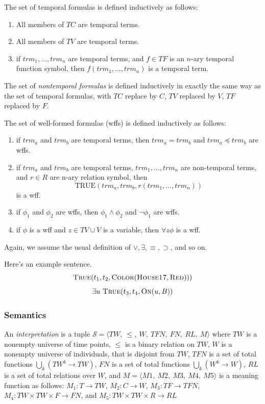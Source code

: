 The set of temporal formulas is defined inductively as follows:
\begin{enumerate}
	\item All members of $TC$ are temporal terms.
	\item All members of $TV$ are temporal terms.
	\item if $trm_1, \dots, trm_n$ are temporal terms, and $f \in TF$ is an $n$-ary temporal function symbol, then $f(trm_1, \dots, trm_n)$ is a temporal term.
\end{enumerate}

The set of \textit{nontemporal formulas} is defined inductively in exactly the same way as the set of temporal formulas, with
$TC$ replace by $C$, $TV$ replaced by $V$, $TF$ replaced by $F$.

The set of well-formed formulas (wffs) is defined inductively as follows:
\begin{enumerate}
	\item if $trm_a$ and $trm_b$ are temporal terms, then $trm_a = trm_b$ and $trm_a \preceq trm_b$ are wffs.
	\item if $trm_a$ and $trm_b$ are temporal terms, $trm_1, \dots, trm_n$ are non-temporal terms, and $r \in R$ are n-ary relation symbol,
	      then
	      \[
		      \text{TRUE}(trm_a, trm_b, r(trm_1, \dots, trm_n))
	      \]
	      is a wff.
	\item if $\phi_1$ and $\phi_2$ are wffs, then $\phi_1 \land \phi_2$ and $\neg \phi_1$ are wffs.
	\item if $\phi$ is a wff and $z \in TV \cup V$ is a variable, then $\forall z \phi$ is a wff.
\end{enumerate}

Again, we assume the usual definition of $\lor, \exists, \equiv, \supset$, and so on.

\begin{exmp} Here's an example sentence.
	\begin{equation}
		\textsc{True}(t_1, t_2, \textsc{Color}(\textsc{House17}, \textsc{Red})))
	\end{equation}
	\begin{equation}
		\exists u \ \textsc{True}(t_3, t_4, \textsc{On}(u,B))
	\end{equation}
\end{exmp}

\subsubsection{Semantics}
An \textit{interpretation} is a tuple $\mathscr{S} = \langle  TW,\ \leqslant,\ W,\ TFN,\ FN,\ RL,\ M\rangle$ where $TW$
is a nonempty universe of time points, $\leqslant$ is a binary relation on $TW$, $W$ is a nonempty universe of individuals,
that is disjoint from $TW$, $TFN$ is a set of total functions $\bigcup_k (TW^k \rightarrow TW)$,
$FN$ is a set of total functions $ \bigcup_k (W^k \rightarrow W)$, $RL$ is a set of total relations over $W$, and
$M = \langle M1,\ M2,\ M3,\ M4,\ M5 \rangle$ is a meaning function as follows: $M_1 : T \rightarrow TW$,
$M_2: C \to W$, $M_3 : TF \to TFN$, $M_4 : TW \times TW \times F \to FN$, and $M_5: TW \times TW \times R \to RL$

